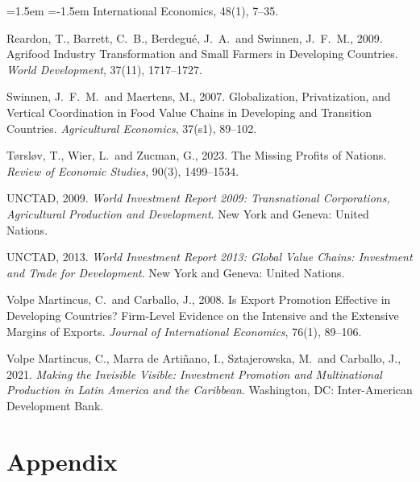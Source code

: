 \documentclass[11pt,a4paper]{article}
\begin{document}
\begin{list}{}{\leftmargin=1.5em \itemindent=-1.5em \itemsep=2pt \topsep=4pt}
{International Economics}, 48(1), 7--35.
\item Reardon, T., Barrett, C.\ B., Berdegu\'e, J.\ A.\ and Swinnen, J.\ F.\ M., 2009. Agrifood
Industry Transformation and Small Farmers in Developing Countries. \emph{World Development}, 37(11),
1717--1727.
\item Swinnen, J.\ F.\ M.\ and Maertens, M., 2007. Globalization, Privatization, and Vertical
Coordination in Food Value Chains in Developing and Transition Countries. \emph{Agricultural
Economics}, 37(s1), 89--102.
\item T{\o}rsl{\o}v, T., Wier, L.\ and Zucman, G., 2023. The Missing Profits of Nations.
\emph{Review of Economic Studies}, 90(3), 1499--1534.
\item UNCTAD, 2009. \emph{World Investment Report 2009: Transnational Corporations, Agricultural
Production and Development}. New York and Geneva: United Nations.
\item UNCTAD, 2013. \emph{World Investment Report 2013: Global Value Chains: Investment and Trade for
Development}. New York and Geneva: United Nations.
\item Volpe Martincus, C.\ and Carballo, J., 2008. Is Export Promotion Effective in Developing
Countries? Firm-Level Evidence on the Intensive and the Extensive Margins of Exports.
\emph{Journal of International Economics}, 76(1), 89--106.
\item Volpe Martincus, C., Marra de Arti\~nano, I., Sztajerowska, M.\ and Carballo, J., 2021.
\emph{Making the Invisible Visible: Investment Promotion and Multinational Production in Latin
America and the Caribbean}. Washington, DC: Inter-American Development Bank.
\end{list}

\clearpage
\appendix
\setcounter{figure}{0}
\setcounter{table}{0}
\renewcommand{\thesubsection}{A.\arabic{subsection}}
\section*{Appendix}\label{sec:app}
\end{document}
